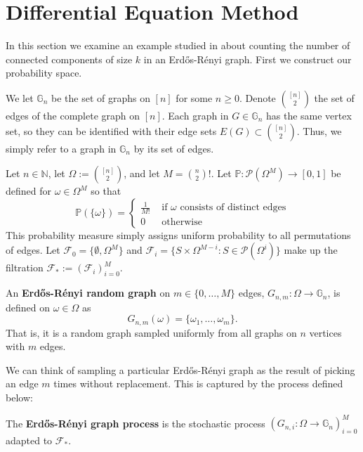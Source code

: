 \section{Differential Equation Method}
\label{example:diffeq}

In this section we examine an example studied in \cite{diffeq_2020} about counting the number of connected components of size \(k\) in an Erdős-Rényi graph. First we  construct our probability space. 

We let \(\mathbb{G}_{n}\) be the set of graphs on \([n]\) for some \(n \geq 0\). Denote \(\binom{[n]}{2}\) the set of edges of the complete graph on \([n]\). Each graph in \(G \in \mathbb{G}_{n}\) has the same vertex set, so they can be identified with their edge sets \(E(G) \subset \binom{[n]}{2}\). Thus, we simply refer to a graph in \(\mathbb{G}_{n}\) by its set of edges. 

Let \(n \in \mathbb{N}\), let \(\Omega :=  \binom{[n]}{2}\), and let \(M = \binom{n}{2}!\). Let \(\mathbb{P}: \mathcal{P}(\Omega^{M}) \to [0,1]\) be defined for \(\omega \in \Omega^{M}\) so that
\[\mathbb{P}(\{\omega\}) = \begin{cases} \frac{1}{M!} & \text{ if } \omega \text{ consists of distinct edges} \\ 0 & \text{ otherwise}\end{cases}\]
This probability measure simply assigns uniform probability to all permutations of edges. Let \(\mathcal{F}_{0}= \{\emptyset, \Omega^{M}\}\) and \(\mathcal{F}_{i} = \{S \times \Omega^{M-i} : S \in \mathcal{P}(\Omega^{i})\}\) make up the filtration \(\mathcal{F}_{*} := (\mathcal{F}_{i})_{i=0}^{M}\).

\begin{definition}
    An \textbf{Erdős-Rényi random graph} on \(m \in \{0, \dots, M\}\) edges, \(G_{n, m}: \Omega \to \mathbb{G}_{n}\), is defined on \(\omega \in \Omega\) as
    \[G_{n, m}(\omega) = \{\omega_{1}, \dots, \omega_{m}\}.\]
    That is, it is a random graph sampled uniformly from all graphs on \(n\) vertices with \(m\) edges. 
\end{definition}

We can think of sampling a particular Erdős-Rényi graph as the result of picking an edge \(m\) times without replacement. This is captured by the process defined below:
\begin{definition}
    The \textbf{Erdős-Rényi graph process} is the stochastic process \((G_{n, i}: \Omega \to \mathbb{G}_{n})_{i=0}^{M}\) adapted to \(\mathcal{F}_{*}\).
\end{definition}

